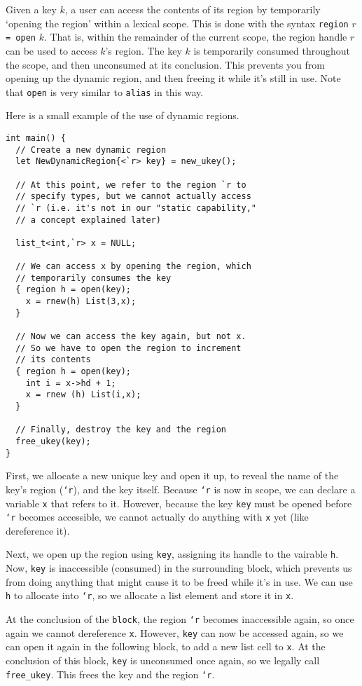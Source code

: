 Given a key $k$, a user can access the contents of its region by temporarily
`opening the region' within a lexical scope.  This is done with the syntax
\verb+region+ $r$ \verb+= open+ $k$.  That is, within the remainder of the
current scope, the region handle $r$ can be used to access $k$'s region.
The key $k$ is temporarily consumed throughout the scope, and then
unconsumed at its conclusion.  This prevents you from opening up the dynamic
region, and then freeing it while it's still in use.  Note that
\texttt{open} is very similar to \texttt{alias} in this way.

Here is a small example of the use of dynamic regions.
\begin{verbatim}
int main() {
  // Create a new dynamic region
  let NewDynamicRegion{<`r> key} = new_ukey();

  // At this point, we refer to the region `r to
  // specify types, but we cannot actually access
  // `r (i.e. it's not in our "static capability,"
  // a concept explained later)

  list_t<int,`r> x = NULL;

  // We can access x by opening the region, which
  // temporarily consumes the key
  { region h = open(key);
    x = rnew(h) List(3,x);
  }

  // Now we can access the key again, but not x.
  // So we have to open the region to increment
  // its contents
  { region h = open(key);
    int i = x->hd + 1;
    x = rnew (h) List(i,x);
  }

  // Finally, destroy the key and the region
  free_ukey(key);
}
\end{verbatim}
First, we allocate a new unique key and open it up, to reveal the name of
the key's region (\texttt{`r}), and the key itself.  Because \texttt{`r} is
now in scope, we can declare a variable \texttt{x} that refers to it.
However, because the key \texttt{key} must be opened before \texttt{`r}
becomes accessible, we cannot actually do anything with \texttt{x} yet (like
dereference it).

Next, we open up the region using \texttt{key}, assigning its handle to the
vairable \texttt{h}.  Now, \texttt{key} is inaccessible (consumed) in the
surrounding block, which prevents us from doing anything that might cause it
to be freed while it's in use.  We can use \texttt{h} to allocate into
\texttt{`r}, so we allocate a list element and store it in \texttt{x}.

At the conclusion of the \texttt{block}, the region \texttt{`r} becomes
inaccessible again, so once again we cannot dereference \texttt{x}.
However, \texttt{key} can now be accessed again, so we can open it again in
the following block, to add a new list cell to \texttt{x}.  At the
conclusion of this block, \texttt{key} is unconsumed once again, so we
legally call \texttt{free\_ukey}.  This frees the key and the region
\texttt{`r}.

